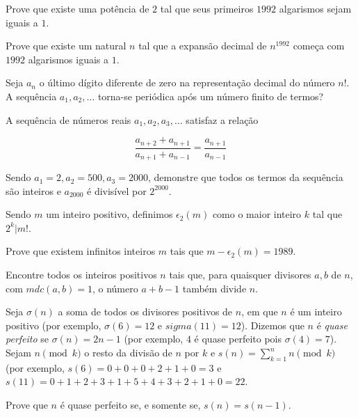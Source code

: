 \begin{questao}
  Prove que existe uma potência de $2$ tal que seus
  primeiros $1992$ algarismos sejam iguais a $1$.

\end{questao}

\begin{questao}
  Prove que existe um natural $n$ tal que a expansão
  decimal de $n^{1992}$ começa com $1992$ algarismos iguais a
  $1$.

\end{questao}

\begin{questao}
  Seja $a_n$ o último dígito diferente de zero na
  representação decimal do número $n!$. A sequência
  $a_1,a_2,\ldots$ torna-se periódica após um número finito de
  termos?
\end{questao}

\begin{questao}
  A sequência de números reais $a_1,a_2,a_3,\ldots$ satisfaz a
  relação

  $$ \frac{a_{n+2}+a_{n+1}}{a_{n+1}+a_{n-1}} =
  \frac{a_{n+1}}{a_{n-1}} $$

  Sendo $a_1=2,a_2=500,a_3=2000$, demonstre que todos os termos da
  sequência são inteiros e $a_{2000}$ é divisível por $2^{2000}$.
\end{questao}

\begin{questao}
  Sendo $m$ um inteiro positivo, definimos
  $\epsilon_2(m)$ como o maior inteiro $k$ tal que $2^k|m!$.

  Prove que existem infinitos inteiros $m$ tais que
  $m-\epsilon_2(m)=1989$.

\end{questao}

\begin{questao}
  Encontre todos os inteiros positivos $n$ tais que, para
  quaisquer divisores $a,b$ de $n$, com $mdc(a,b)=1$, o número
  $a+b-1$ também divide $n$.

\end{questao}

\begin{questao}
  Seja $\sigma(n)$ a soma de todos os divisores positivos
  de $n$, em que $n$ é um inteiro positivo (por exemplo,
  $\sigma(6)=12$ e $sigma(11)=12$). Dizemos que $n$ é {\it quase
    perfeito} se $\sigma(n)=2n-1$ (por exemplo, $4$ é quase
  perfeito pois $\sigma(4)=7$). Sejam $n \pmod k$ o resto da
  divisão de $n$ por $k$ e $s(n)=\sum_{k=1}^{n}{n \pmod k}$ (por
  exemplo, $s(6)=0+0+0+2+1+0=3$ e
  $s(11)=0+1+2+3+1+5+4+3+2+1+0=22$.

  Prove que $n$ é quase perfeito se, e somente se, $s(n)=s(n-1)$.

\end{questao}

